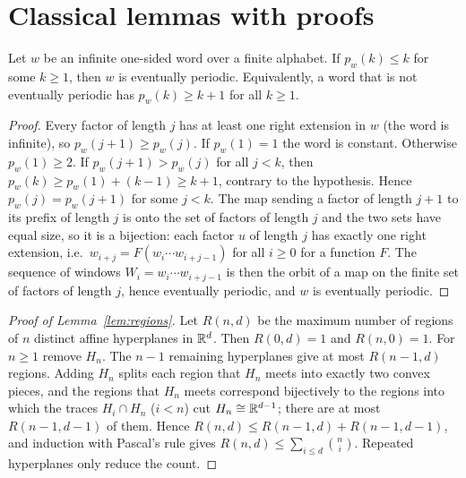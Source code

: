 \appendix
\section{Classical lemmas with proofs}\label{app:classical}
\begin{lemma}\label{lem:mh}
Let $w$ be an infinite one-sided word over a finite alphabet. If $p_w(k)\le k$ for some $k\ge1$, then $w$ is eventually periodic. Equivalently, a word that is not eventually periodic has $p_w(k)\ge k+1$ for all $k\ge1$.
\end{lemma}
\begin{proof}
Every factor of length $j$ has at least one right extension in $w$ (the word is infinite), so $p_w(j+1)\ge p_w(j)$. If $p_w(1)=1$ the word is constant. Otherwise $p_w(1)\ge2$. If $p_w(j+1)>p_w(j)$ for all $j<k$, then $p_w(k)\ge p_w(1)+(k-1)\ge k+1$, contrary to the hypothesis. Hence $p_w(j)=p_w(j+1)$ for some $j<k$. The map sending a factor of length $j+1$ to its prefix of length $j$ is onto the set of factors of length $j$ and the two sets have equal size, so it is a bijection: each factor $u$ of length $j$ has exactly one right extension, i.e.\ $w_{i+j}=F(w_i\cdots w_{i+j-1})$ for all $i\ge0$ for a function $F$. The sequence of windows $W_i=w_i\cdots w_{i+j-1}$ is then the orbit of a map on the finite set of factors of length $j$, hence eventually periodic, and $w$ is eventually periodic. \end{proof}

\begin{proof}[Proof of Lemma~\ref{lem:regions}]
Let $R(n,d)$ be the maximum number of regions of $n$ distinct affine hyperplanes in $\mathbb{R}^d$. Then $R(0,d)=1$ and $R(n,0)=1$. For $n\ge1$ remove $H_n$. The $n-1$ remaining hyperplanes give at most $R(n-1,d)$ regions. Adding $H_n$ splits each region that $H_n$ meets into exactly two convex pieces, and the regions that $H_n$ meets correspond bijectively to the regions into which the traces $H_i\cap H_n$ ($i<n$) cut $H_n\cong\mathbb{R}^{d-1}$; there are at most $R(n-1,d-1)$ of them. Hence $R(n,d)\le R(n-1,d)+R(n-1,d-1)$, and induction with Pascal's rule gives $R(n,d)\le\sum_{i\le d}\binom ni$. Repeated hyperplanes only reduce the count. \end{proof}

